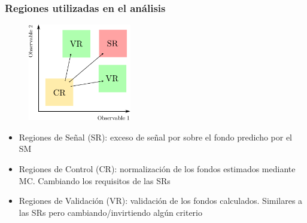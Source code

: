 \documentclass[10pt, compress,spanish]{beamer}
\begin{document}
\begin{frame}[fragile]

\frametitle{Regiones utilizadas en el análisis}
\normalsize


\begin{figure}
\centering
\includegraphics[width=0.40\textwidth]{regions.pdf}
\end{figure}


\begin{itemize}

\item Regiones de Señal (SR): exceso de señal por sobre el fondo predicho por el SM

\item Regiones de Control (CR): normalización de los fondos estimados mediante MC. Cambiando los requisitos de las SRs

\item Regiones de Validación (VR): validación de los fondos calculados. Similares a las SRs pero cambiando/invirtiendo algún criterio

\end{itemize}


\end{frame}



\end{document}
